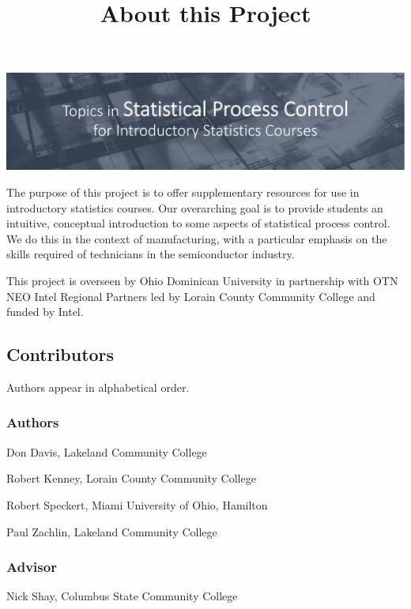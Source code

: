 \documentclass{ximera}
\title{About this Project} \license{CC BY-NC-SA 4.0}
\begin{document}
\begin{abstract}
\end{abstract}
\maketitle

\begin{image}
\includegraphics{titleSlideQC.jpg}
\end{image}

The purpose of this project is to offer supplementary resources for use in introductory statistics courses.  Our overarching goal is to provide students an intuitive, conceptual introduction to some 
aspects of statistical process control.  We do this in the context of manufacturing, with a particular emphasis on the skills required of technicians in the semiconductor industry.

This project is overseen by Ohio Dominican University in partnership with OTN NEO Intel Regional Partners led by Lorain County Community College and funded by Intel.


\subsection*{Contributors}
Authors appear in alphabetical order.

\subsubsection*{Authors}

Don Davis, Lakeland Community College

Robert Kenney, Lorain County Community College

Robert Speckert, Miami University of Ohio, Hamilton

Paul Zachlin, Lakeland Community College

\subsubsection*{Advisor}
Nick Shay, Columbus State Community College
\end{document}
